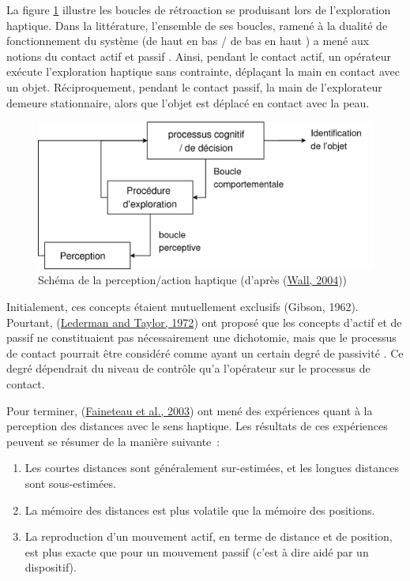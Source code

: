\documentclass[
]{book}
\providecommand{\tightlist}{%
  \setlength{\itemsep}{0pt}\setlength{\parskip}{0pt}}
\begin{document}
La figure \ref{fig:actionHaptique} illustre les boucles
de rétroaction se produisant lors de l'exploration haptique. Dans la
littérature, l'ensemble de ses boucles, ramené à la dualité de fonctionnement
du système (de haut en bas / de bas en haut ) a mené aux notions du contact
actif et passif . Ainsi, pendant le contact actif, un opérateur exécute
l'exploration haptique sans contrainte, déplaçant la main en contact avec un
objet. Réciproquement, pendant le contact passif, la main de l'explorateur
demeure stationnaire, alors que l'objet est déplacé en contact avec la
peau.

\begin{figure}
\centering
\includegraphics{img/bouclesPerception.png}
\caption{\label{fig:actionHaptique}Schéma de la perception/action haptique
(d'après (\protect\hyperlink{ref-wall2004investigation}{Wall, 2004}))}
\end{figure}

Initialement, ces concepts étaient mutuellement exclusifs (Gibson, 1962).
Pourtant, (\protect\hyperlink{ref-lederman1972fingertip}{Lederman and Taylor, 1972})
ont proposé que les concepts d'actif et de passif ne constituaient pas
nécessairement une dichotomie, mais que le processus de contact pourrait être
considéré comme ayant un certain degré de passivité . Ce degré dépendrait du
niveau de contrôle qu'a l'opérateur sur le processus de contact.

Pour terminer, (\protect\hyperlink{ref-faineteau2003kinaesthetic}{Faineteau et al., 2003}) ont mené des expériences quant à la perception des distances avec
le sens haptique. Les résultats de ces expériences peuvent se résumer de la
manière suivante~:

\begin{enumerate}
\def\labelenumi{\arabic{enumi}.}
\tightlist
\item
  Les courtes distances sont généralement
  sur-estimées, et les longues distances sont sous-estimées.
\item
  La mémoire des distances est plus volatile que la
  mémoire des positions.
\item
  La reproduction d'un mouvement actif, en terme de
  distance et de position, est plus exacte que pour un mouvement passif
  (c'est à dire aidé par un dispositif).
\end{enumerate}
\end{document}
